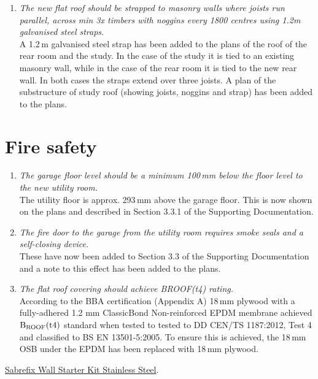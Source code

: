 \documentclass{extension}
\begin{document}
\begin{enumerate}
\item {\it The new flat roof should be strapped to masonry walls where joists run parallel, across min 3x timbers with noggins every 1800 centres using 1.2m galvanised steel straps.}\\
A 1.2\,m galvanised steel strap has been added to the plans of the roof of the rear room and the study. In the case of the study it is tied to an existing masonry wall, while in the case of the rear room it is tied to the new rear wall. In both cases the straps extend over three joists. A plan of the substructure of study roof (showing joists, noggins and strap) has been added to the plans.
\end{enumerate}

\section{Fire safety}
\begin{enumerate}
\item {\it The garage floor level should be a minimum 100\,mm below the floor level to the new utility room.}\\
The utility floor is approx. 293\,mm above the garage floor. This is now shown on the plans and described in Section 3.3.1 of the Supporting Documentation.
\item {\it The fire door to the garage from the utility room requires smoke seals and a self-closing device.}\\
These have now been added to Section 3.3 of the Supporting Documentation and a note to this effect has been added to the plans.
\item {\it The flat roof covering should achieve BROOF(t4) rating.}\\According to the BBA certification (Appendix A) 18\,mm plywood with a fully-adhered 1.2 mm ClassicBond Non-reinforced EPDM membrane achieved ${\rm B_{ROOF}(t4)}$ standard when tested to tested to DD CEN/TS 1187:2012, Test 4 and classified to BS EN 13501-5:2005. To ensure this is achieved, the 18\,mm OSB under the EPDM has been replaced with 18\,mm plywood.
\end{enumerate}


\begin{thebibliography}{9}
 \href{https://www.screwfix.com/p/sabrefix-wall-starter-kit-stainless-steel/56037?kpid=56037&cm_mmc=Google-_-Datafeed-_-Building%20and%20Doors?kpid=KINASEKPID&cm_mmc=Google-_-TOKEN1-_-TOKEN2&gclid=EAIaIQobChMIvrnvoZmQgQMVjIFQBh3P7gMrEAQYAiABEgIWrvD_BwE&gclsrc=aw.ds}{Sabrefix Wall Starter Kit Stainless Steel}.



\end{thebibliography}
\end{document}
